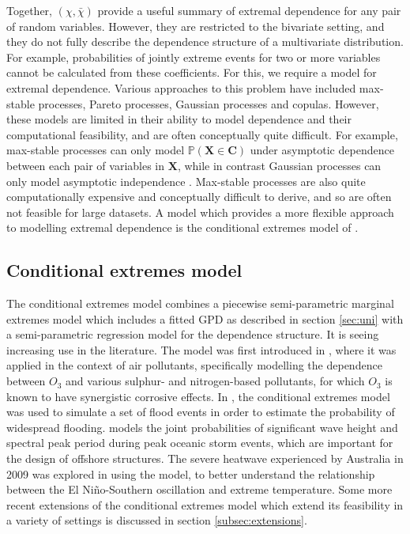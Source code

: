 \documentclass{article}
\numberwithin{equation}{section}
\begin{document}
Together, $(\chi, \bar{\chi})$ provide a useful summary of extremal dependence for any pair of random variables.
However, they are restricted to the bivariate setting, and they do not fully describe the dependence structure of a multivariate distribution.
For example, probabilities of jointly extreme events for two or more variables cannot be calculated from these coefficients.
For this, we require a model for extremal dependence.
Various approaches to this problem have included max-stable processes, Pareto processes, Gaussian processes and copulas.
However, these models are limited in their ability to model dependence and their computational feasibility, and are often conceptually quite difficult. 
For example, max-stable processes can only model $\mathbb{P}(\bm{X} \in \bm{C})$ under asymptotic dependence between each pair of variables in $\bm{X}$, while in contrast Gaussian processes can only model asymptotic independence \citep{Tawn2018, Huser2024}.
Max-stable processes are also quite computationally expensive and conceptually difficult to derive, and so are often not feasible for large datasets.
A model which provides a more flexible approach to modelling extremal dependence is the conditional extremes model of \citet{Heffernan2004}.


\subsection{Conditional extremes model}


The conditional extremes model combines a piecewise semi-parametric marginal extremes model which includes a fitted GPD as described in section \ref{sec:uni} with a semi-parametric regression model for the dependence structure. 
It is seeing increasing use in the literature.
The model was first introduced in \citet{Heffernan2004}, where it was applied in the context of air pollutants, specifically modelling the dependence between $O_3$ and various sulphur- and nitrogen-based pollutants, for which $O_3$ is known to have synergistic corrosive effects. 
In \citet{Keef2012_flooding}, the conditional extremes model was used to simulate a set of flood events in order to estimate the probability of widespread flooding. 
\citet{Jonathan2013} models the joint probabilities of significant wave height and spectral peak period during peak oceanic storm events, which are important for the design of offshore structures. 
The severe heatwave experienced by Australia in 2009 was explored in \citet{Winter2016} using the model, to better understand the relationship between the El Niño-Southern oscillation and extreme temperature.
Some more recent extensions of the conditional extremes model which extend its feasibility in a variety of settings is discussed in section \ref{subsec:extensions}.
\end{document}
